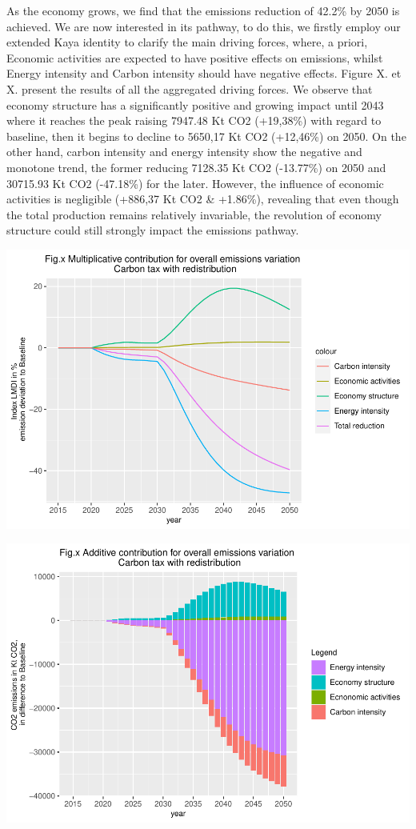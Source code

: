 \documentclass[
]{article}
\begin{document}
As the economy grows, we find that the emissions reduction of 42.2\% by
2050 is achieved. We are now interested in its pathway, to do this, we
firstly employ our extended Kaya identity to clarify the main driving
forces, where, a priori, Economic activities are expected to have
positive effects on emissions, whilst Energy intensity and Carbon
intensity should have negative effects. Figure X. et X. present the
results of all the aggregated driving forces. We observe that economy
structure has a significantly positive and growing impact until 2043
where it reaches the peak raising 7947.48 Kt CO2 (+19,38\%) with regard
to baseline, then it begins to decline to 5650,17 Kt CO2 (+12,46\%) on
2050. On the other hand, carbon intensity and energy intensity show the
negative and monotone trend, the former reducing 7128.35 Kt CO2
(-13.77\%) on 2050 and 30715.93 Kt CO2 (-47.18\%) for the later.
However, the influence of economic activities is negligible (+886,37 Kt
CO2 \& +1.86\%), revealing that even though the total production remains
relatively invariable, the revolution of economy structure could still
strongly impact the emissions pathway.

\includegraphics{Modele-ThreeMe-Tunisie_Sequeira_Valilou_Wang_files/figure-latex/unnamed-chunk-16-1.pdf}

\includegraphics{Modele-ThreeMe-Tunisie_Sequeira_Valilou_Wang_files/figure-latex/unnamed-chunk-17-1.pdf}
\end{document}

